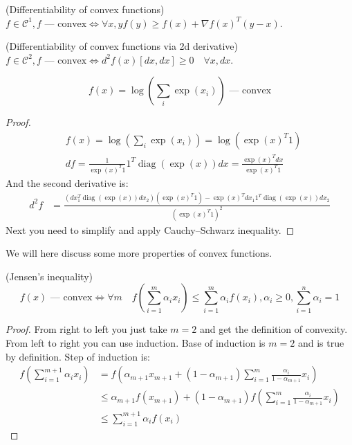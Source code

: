 \begin{theorem} (Differentiability of convex functions) \\
    $f \in \mathcal{C}^1, f \text{ --- convex} \Longleftrightarrow \forall x, y f(y) \geqslant f(x) + \nabla f(x)^T (y - x)$.
\end{theorem}

\begin{theorem} (Differentiability of convex functions via 2d derivative) \\
    $f \in \mathcal{C}^2, f \text{ --- convex} \Longleftrightarrow d^2 f(x) [dx, dx] \geqslant 0 \quad \forall x, dx$.
\end{theorem}

\begin{theorem} 
    \[ 
        f(x) = \log(\sum_i \exp(x_i)) \text{ --- convex} 
    \] 
\end{theorem}
\begin{proof}
\begin{align*}
    &f(x) = \log(\sum_i \exp(x_i)) = \log(\exp(x)^T 1) \\ 
    &df = \frac{1}{\exp(x)^T 1} 1^T \operatorname{diag} (\exp(x)) dx = \frac{\exp(x)^T dx}{\exp(x)^T 1}
\end{align*}
And the second derivative is:
\begin{align*}
    d^2 f &= \frac{(d x_1^T \operatorname{diag}(\exp(x)) dx_2) (\exp(x)^T 1) - \exp(x)^T dx_1 1^T \operatorname{diag}(\exp(x)) dx_2}{(\exp(x)^T 1)^2}
\end{align*}
Next you need to simplify and apply Cauchy–Schwarz inequality.
\end{proof}

\vspace{1em}

We will here discuss some more properties of convex functions. 

\begin{theorem} (Jensen's inequality) \\
    \[
        f(x) \text{ --- convex} \Longleftrightarrow \forall m \quad f(\sum\limits_{i=1}^m \alpha_i x_i) \leq \sum\limits_{i=1}^m \alpha_i f(x_i), \alpha_i \geq 0, \sum\limits_{i=1}^n \alpha_i = 1
    \] 
\end{theorem}
\begin{proof}
    From right to left you just take $m = 2$ and get the definition of convexity. From left to right you can use induction. Base of induction is $m = 2$ and is true by definition. Step of induction is:
    \begin{align*}
        f(\sum_{i=1}^{m+1} \alpha_i x_i) &= f(\alpha_{m+1} x_{m+1} + (1 - \alpha_{m+1}) \sum_{i=1}^m \frac{\alpha_i}{1 - \alpha_{m+1}} x_i) \\
        &\leq \alpha_{m+1} f(x_{m+1}) + (1 - \alpha_{m+1}) f(\sum_{i=1}^m \frac{\alpha_i}{1 - \alpha_{m+1}} x_i) \\
        &\leq \sum_{i=1}^{m+1} \alpha_i f(x_i)
    \end{align*}
\end{proof}

